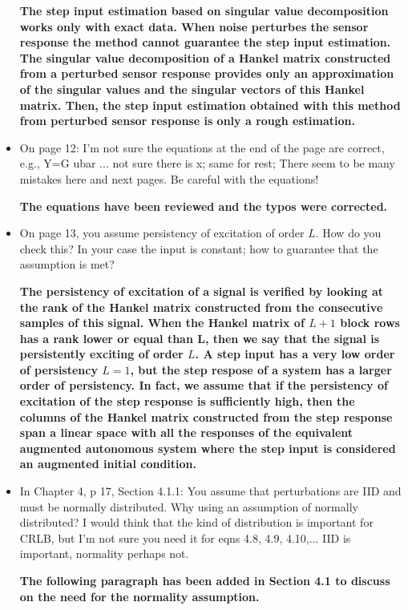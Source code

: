 \documentclass[11pt]{article}
\begin{document}
\begin{itemize}
	{\bfseries The step input estimation based on singular value decomposition works only with exact data. When  noise perturbes the sensor response the method cannot guarantee the step input estimation. The singular value decomposition of a Hankel matrix constructed from a perturbed sensor response provides only an approximation of the singular values and the singular vectors of this Hankel matrix. Then, the step input estimation obtained with this method from perturbed sensor response is only a rough estimation.     }
	
	\item  On page 12: I’m not sure the equations at the end of the page are correct, e.g., Y=G ubar ... not sure there is x; same for rest; There seem to be many mistakes here and next pages. Be careful with the equations!
	
	{\bfseries The equations have been reviewed and the typos were corrected.}
	
	\item  On page 13, you assume persistency of excitation of order $L$. How do you check this? In your case the input is constant; how to guarantee that the assumption is met?
	
	{\bfseries The persistency of excitation of a signal is verified by looking at the rank of the Hankel matrix constructed from the consecutive samples of this signal. When the Hankel matrix of $L+1$ block rows has a rank lower or equal than L, then we say that the signal is persistently exciting of order $L$. A step input has a very low order of persistency $L=1$, but the step respose of a system has a larger order of persistency. In fact, we assume that if the persistency of excitation of the step response is sufficiently high, then the columns of the Hankel matrix constructed from the step response span a linear space with all the responses of the equivalent augmented autonomous system where the step input is considered an augmented initial condition.}

	\item  In Chapter 4, p 17, Section 4.1.1: You assume that perturbations are IID and must be normally distributed. Why using an assumption of normally distributed? I would think that the kind of distribution is important for CRLB, but I’m not sure you need it for eqns 4.8, 4.9, 4.10,... IID is important, normality perhaps not.
	
	{\bfseries The following paragraph has been added in Section 4.1 to discuss on the need for the normality assumption.  }
	

\end{itemize}
\end{document}
